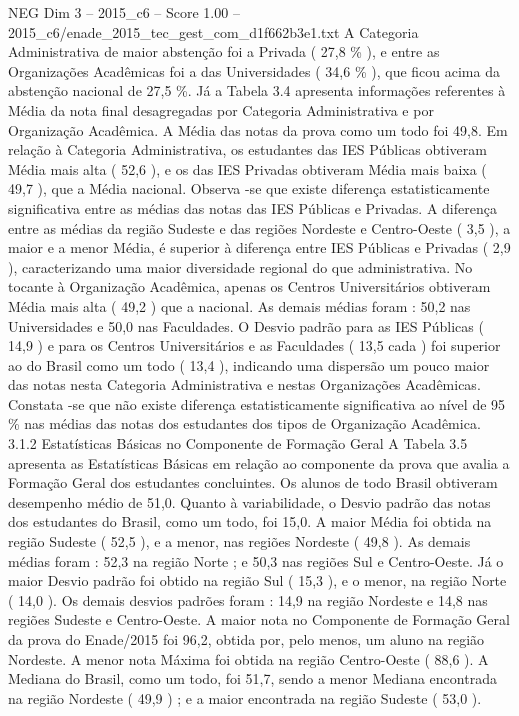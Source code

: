 \begin{textsample}{NEG Dim 3 – 2015\_c6 – Score 1.00 – 2015\_c6/enade\_2015\_tec\_gest\_com\_d1f662b3e1.txt}
A Categoria Administrativa de maior abstenção foi a Privada ( 27,8 \% ), e entre as Organizações Acadêmicas foi a das Universidades ( 34,6 \% ), que ficou acima da abstenção nacional de 27,5 \%.
Já a Tabela 3.4 apresenta informações referentes à Média da nota final desagregadas por Categoria Administrativa e por Organização Acadêmica.
A Média das notas da prova como um todo foi 49,8.
Em relação à Categoria Administrativa, os estudantes das IES Públicas obtiveram Média mais alta ( 52,6 ), e os das IES Privadas obtiveram Média mais baixa ( 49,7 ), que a Média nacional.
Observa -se que existe diferença estatisticamente significativa entre as médias das notas das IES Públicas e Privadas.
A diferença entre as médias da região Sudeste e das regiões Nordeste e Centro-Oeste ( 3,5 ), a maior e a menor Média, é superior à diferença entre IES Públicas e Privadas ( 2,9 ), caracterizando uma maior diversidade regional do que administrativa.
No tocante à Organização Acadêmica, apenas os Centros Universitários obtiveram Média mais alta ( 49,2 ) que a nacional.
As demais médias foram : 50,2 nas Universidades e 50,0 nas Faculdades.
O Desvio padrão para as IES Públicas ( 14,9 ) e para os Centros Universitários e as Faculdades ( 13,5 cada ) foi superior ao do Brasil como um todo ( 13,4 ), indicando uma dispersão um pouco maior das notas nesta Categoria Administrativa e nestas Organizações Acadêmicas.
Constata -se que não existe diferença estatisticamente significativa ao nível de 95 \% nas médias das notas dos estudantes dos tipos de Organização Acadêmica. 3.1.2 Estatísticas Básicas no Componente de Formação Geral A Tabela 3.5 apresenta as Estatísticas Básicas em relação ao componente da prova que avalia a Formação Geral dos estudantes concluintes.
Os alunos de todo Brasil obtiveram desempenho médio de 51,0.
Quanto à variabilidade, o Desvio padrão das notas dos estudantes do Brasil, como um todo, foi 15,0.
A maior Média foi obtida na região Sudeste ( 52,5 ), e a menor, nas regiões Nordeste ( 49,8 ).
As demais médias foram : 52,3 na região Norte ; e 50,3 nas regiões Sul e Centro-Oeste.
Já o maior Desvio padrão foi obtido na região Sul ( 15,3 ), e o menor, na região Norte ( 14,0 ).
Os demais desvios padrões foram : 14,9 na região Nordeste e 14,8 nas regiões Sudeste e Centro-Oeste.
A maior nota no Componente de Formação Geral da prova do Enade/2015 foi 96,2, obtida por, pelo menos, um aluno na região Nordeste.
A menor nota Máxima foi obtida na região Centro-Oeste ( 88,6 ).
A Mediana do Brasil, como um todo, foi 51,7, sendo a menor Mediana encontrada na região Nordeste ( 49,9 ) ; e a maior encontrada na região Sudeste ( 53,0 ).

\end{textsample}
